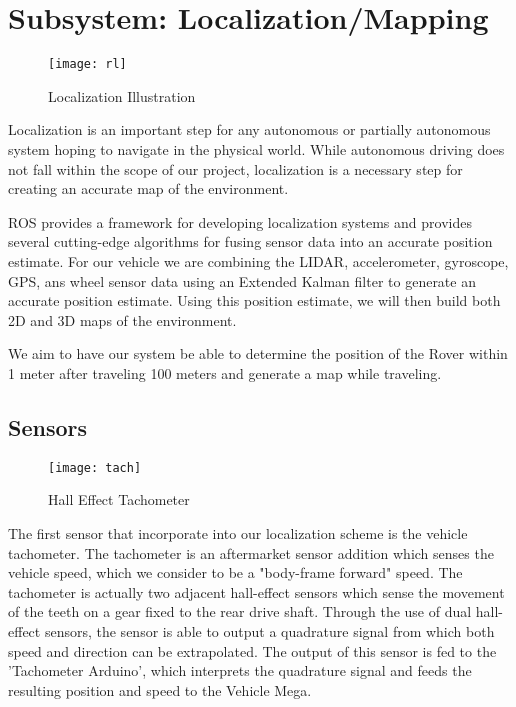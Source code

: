 \chapter{Subsystem: Localization/Mapping} \label{chap:Localization}


\begin{figure}[H]
	\centerline{\texttt{[image: rl]}}
	\caption[]{Localization Illustration \cite{clearpath}}
	\label{fig:robotlocalization}
\end{figure}

Localization is an important step for any autonomous or partially autonomous system hoping to navigate in the physical world. While autonomous driving does not fall within the scope of our project, localization is a necessary step for creating an accurate map of the environment. 

ROS provides a framework for developing localization systems and provides several cutting-edge algorithms for fusing sensor data into an accurate position estimate. For our vehicle we are combining the LIDAR, accelerometer, gyroscope, GPS, ans wheel sensor data using an Extended Kalman filter to generate an accurate position estimate. Using this position estimate, we will then build both 2D and 3D maps of the environment. 

We aim to have our system be able to determine the position of the Rover within 1 meter after traveling 100 meters and generate a map while traveling.

\section{Sensors}


\begin{figure}[H]
	\centerline{\texttt{[image: tach]}}
	\caption[]{Hall Effect Tachometer}
	\label{fig:tach}
\end{figure}

The first sensor that incorporate into our localization scheme is the vehicle tachometer. The tachometer is an aftermarket sensor addition which senses the vehicle speed, which we consider to be a "body-frame forward" speed. The tachometer is actually two adjacent hall-effect sensors which sense the movement of the teeth on a gear fixed to the rear drive shaft. Through the use of dual hall-effect sensors, the sensor is able to output a quadrature signal from which both speed and direction can be extrapolated. The output of this sensor is fed to the 'Tachometer Arduino', which interprets the quadrature signal and feeds the resulting position and speed to the Vehicle Mega.

